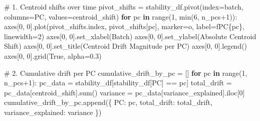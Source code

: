 \documentclass[
  letterpaper,
  DIV=11,
  numbers=noendperiod]{scrartcl}
\newenvironment{Shaded}{\begin{snugshade}}{\end{snugshade}}
\newcommand{\BuiltInTok}[1]{\textcolor[rgb]{0.00,0.23,0.31}{#1}}
\newcommand{\CommentTok}[1]{\textcolor[rgb]{0.37,0.37,0.37}{#1}}
\newcommand{\ControlFlowTok}[1]{\textcolor[rgb]{0.00,0.23,0.31}{\textbf{#1}}}
\newcommand{\DecValTok}[1]{\textcolor[rgb]{0.68,0.00,0.00}{#1}}
\newcommand{\FloatTok}[1]{\textcolor[rgb]{0.68,0.00,0.00}{#1}}
\newcommand{\KeywordTok}[1]{\textcolor[rgb]{0.00,0.23,0.31}{\textbf{#1}}}
\newcommand{\NormalTok}[1]{\textcolor[rgb]{0.00,0.23,0.31}{#1}}
\newcommand{\OperatorTok}[1]{\textcolor[rgb]{0.37,0.37,0.37}{#1}}
\newcommand{\SpecialCharTok}[1]{\textcolor[rgb]{0.37,0.37,0.37}{#1}}
\newcommand{\SpecialStringTok}[1]{\textcolor[rgb]{0.13,0.47,0.30}{#1}}
\newcommand{\StringTok}[1]{\textcolor[rgb]{0.13,0.47,0.30}{#1}}
\newcommand{\VariableTok}[1]{\textcolor[rgb]{0.07,0.07,0.07}{#1}}
\renewenvironment{Shaded}{%
  \begin{tcolorbox}[%
    enhanced,%
    colback=codebg,%
    colframe=codebg,%
    borderline west={3pt}{0pt}{sectionblue},%
    fontupper=\small\ttfamily,%
    boxrule=0pt,%
    arc=0pt,%
    boxsep=5pt,%
    left=2mm,%
    right=2mm,%
    top=2mm,%
    bottom=2mm%
  ]%
}{%
  \end{tcolorbox}%
}
\begin{document}
\begin{Shaded}
\begin{Highlighting}[]
\CommentTok{\# 1. Centroid shifts over time}
\NormalTok{pivot\_shifts }\OperatorTok{=}\NormalTok{ stability\_df.pivot(index}\OperatorTok{=}\StringTok{\textquotesingle{}batch\textquotesingle{}}\NormalTok{, columns}\OperatorTok{=}\StringTok{\textquotesingle{}PC\textquotesingle{}}\NormalTok{, values}\OperatorTok{=}\StringTok{\textquotesingle{}centroid\_shift\textquotesingle{}}\NormalTok{)}
\ControlFlowTok{for}\NormalTok{ pc }\KeywordTok{in} \BuiltInTok{range}\NormalTok{(}\DecValTok{1}\NormalTok{, }\BuiltInTok{min}\NormalTok{(}\DecValTok{6}\NormalTok{, n\_pcs}\OperatorTok{+}\DecValTok{1}\NormalTok{)):}
\NormalTok{    axes[}\DecValTok{0}\NormalTok{, }\DecValTok{0}\NormalTok{].plot(pivot\_shifts.index, pivot\_shifts[pc], marker}\OperatorTok{=}\StringTok{\textquotesingle{}o\textquotesingle{}}\NormalTok{, label}\OperatorTok{=}\SpecialStringTok{f\textquotesingle{}PC}\SpecialCharTok{\{}\NormalTok{pc}\SpecialCharTok{\}}\SpecialStringTok{\textquotesingle{}}\NormalTok{, linewidth}\OperatorTok{=}\DecValTok{2}\NormalTok{)}
\NormalTok{axes[}\DecValTok{0}\NormalTok{, }\DecValTok{0}\NormalTok{].set\_xlabel(}\StringTok{\textquotesingle{}Batch\textquotesingle{}}\NormalTok{)}
\NormalTok{axes[}\DecValTok{0}\NormalTok{, }\DecValTok{0}\NormalTok{].set\_ylabel(}\StringTok{\textquotesingle{}Absolute Centroid Shift\textquotesingle{}}\NormalTok{)}
\NormalTok{axes[}\DecValTok{0}\NormalTok{, }\DecValTok{0}\NormalTok{].set\_title(}\StringTok{\textquotesingle{}Centroid Drift Magnitude per PC\textquotesingle{}}\NormalTok{)}
\NormalTok{axes[}\DecValTok{0}\NormalTok{, }\DecValTok{0}\NormalTok{].legend()}
\NormalTok{axes[}\DecValTok{0}\NormalTok{, }\DecValTok{0}\NormalTok{].grid(}\VariableTok{True}\NormalTok{, alpha}\OperatorTok{=}\FloatTok{0.3}\NormalTok{)}

\CommentTok{\# 2. Cumulative drift per PC}
\NormalTok{cumulative\_drift\_by\_pc }\OperatorTok{=}\NormalTok{ []}
\ControlFlowTok{for}\NormalTok{ pc }\KeywordTok{in} \BuiltInTok{range}\NormalTok{(}\DecValTok{1}\NormalTok{, n\_pcs}\OperatorTok{+}\DecValTok{1}\NormalTok{):}
\NormalTok{    pc\_data }\OperatorTok{=}\NormalTok{ stability\_df[stability\_df[}\StringTok{\textquotesingle{}PC\textquotesingle{}}\NormalTok{] }\OperatorTok{==}\NormalTok{ pc]}
\NormalTok{    total\_drift }\OperatorTok{=}\NormalTok{ pc\_data[}\StringTok{\textquotesingle{}centroid\_shift\textquotesingle{}}\NormalTok{].}\BuiltInTok{sum}\NormalTok{()}
\NormalTok{    variance }\OperatorTok{=}\NormalTok{ pc\_data[}\StringTok{\textquotesingle{}variance\_explained\textquotesingle{}}\NormalTok{].iloc[}\DecValTok{0}\NormalTok{]}
\NormalTok{    cumulative\_drift\_by\_pc.append(\{}
        \StringTok{\textquotesingle{}PC\textquotesingle{}}\NormalTok{: pc,}
        \StringTok{\textquotesingle{}total\_drift\textquotesingle{}}\NormalTok{: total\_drift,}
        \StringTok{\textquotesingle{}variance\_explained\textquotesingle{}}\NormalTok{: variance}
\NormalTok{    \})}


\end{Highlighting}
\end{Shaded}
\end{document}
